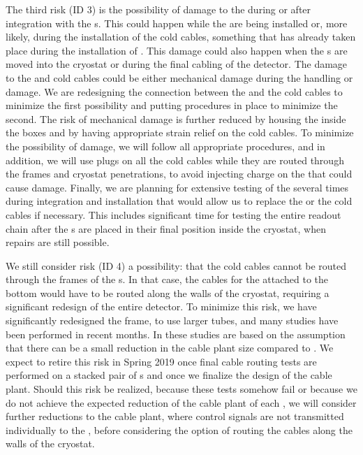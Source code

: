 The third risk (ID 3) is the possibility of damage to the 
 during or after integration with the s. This could
happen while the  are being installed or, more likely, during the
installation of the cold cables, something that has already taken place during
the installation of . This damage could also happen when the s are
moved into the cryostat or during the final cabling of the detector. The damage
to the  and cold cables could be either mechanical damage during the
handling or  damage. We are redesigning the connection between the 
and the cold cables to minimize the first possibility and putting procedures in place
to minimize the second. The risk of mechanical damage
is further reduced by housing the  inside the  boxes and by having 
appropriate strain relief on the cold cables. To minimize the possibility of
 damage, we will follow all appropriate procedures, and in addition,
we will use plugs on all the cold cables while they are routed through the
 frames and cryostat penetrations, to avoid injecting charge on
the  that could cause  damage. Finally, we are planning for
extensive testing of the  several times during integration
and installation that would allow us to replace the 
or the cold cables if necessary. This includes significant time for testing the entire readout 
chain after the s are placed in their final position inside the cryostat,
when repairs are still possible.

We still consider risk (ID 4) a possibility: that the cold cables cannot
be routed through the frames of the s. In that case, the cables for the
 attached to the bottom  would have to be routed along the
walls of the cryostat, requiring a significant redesign of the entire detector. 
To minimize this risk, we have significantly redesigned the  frame, 
to use larger tubes, and many studies have been performed in recent months.
In these studies are based on the assumption that there can be a small reduction in
the cable plant size compared to . We expect to retire this risk
in Spring 2019 once final cable routing tests are performed on
a stacked pair of s and once we finalize the design of the  cable plant. Should
this risk be realized, because these tests somehow fail or because we do not 
achieve the expected reduction of the cable plant of each , we will 
consider further reductions to the cable plant, where control signals are not
transmitted individually to the , before considering the option of 
routing the cables along the walls of the cryostat.

